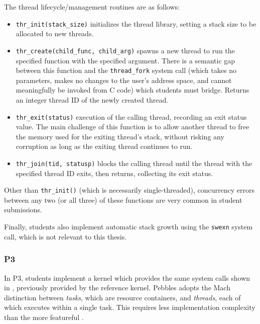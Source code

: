 The thread lifecycle/management routines are as follows:
\begin{itemize}
	\item {\tt thr\_init(stack\_size)} initializes the thread library, setting a  stack size to be allocated to new threads.
	\item {\tt thr\_create(child\_func, child\_arg)} spawns a new thread to run the specified function with the specified argument. There is a semantic gap between this function and the {\tt thread\_fork} system call (which takes no parameters, makes no changes to the user's address space, and cannot meaningfully be invoked from C code) which students must bridge.
		Returns an integer thread ID of the newly created thread.
	\item {\tt thr\_exit(status)}  execution of the calling thread, recording an exit status value.
		The main challenge of this function is to allow another thread to free the memory used for the exiting thread's stack,
		without risking any corruption as long as the exiting thread continues to run.
	\item {\tt thr\_join(tid, statusp)} blocks the calling thread until the thread with the specified thread ID exits, then returns, collecting its exit status.
\end{itemize}
Other than {\tt thr\_init()} (which is necessarily single-threaded),
concurrency errors between any two (or all three) of these functions are very common in student submissions.

Finally, students also implement automatic stack growth using the {\tt swexn} system call, which is not relevant to this thesis.

\subsubsection{P3}
In P3, students implement a kernel which provides the same system calls shown in , previously provided by the reference kernel.
Pebbles adopts the Mach \cite{DBLP:conf/usenix/AccettaBBGRTY86} distinction between {\em tasks}, which are resource containers, and {\em threads}, each of which executes within a single task.
This requires less implementation complexity than the more featureful
.

